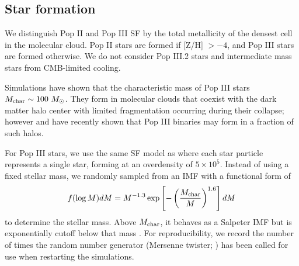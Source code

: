 \documentclass[apjl]{emulateapj}
\begin{document}

\subsection{Star formation}

We distinguish Pop II and Pop III SF by the total metallicity of the
densest cell in the molecular cloud.  Pop II stars are formed if [Z/H]
$> -4$, and Pop III stars are formed otherwise.  We do not consider
Pop III.2 stars and intermediate mass stars from CMB-limited cooling.

Simulations have shown that the characteristic mass of Pop III stars
$M_{\rm char} \sim 100~\Ms$.  They form in molecular clouds that
coexist with the dark matter halo center with limited fragmentation
occurring during their collapse; however \citet{2009Sci...325..601T}
and \citet{Stacy10_Binary} have recently shown that Pop III binaries
may form in a fraction of such halos.


For Pop III stars, we use the same SF model as \citet{Wise08_Gal} where
each star particle represents a single star, forming at an overdensity
of $5 \times 10^5$.  Instead of using a fixed stellar mass, we randomly
sampled from an IMF with a functional form of
%
\begin{equation}
\label{eqn:imf}
f(\log M) dM = M^{-1.3} \exp\left[-\left(\frac{M_{\rm
      char}}{M}\right)^{1.6}\right] dM
\end{equation}
to determine the stellar mass.  Above $M_{\rm char}$, it behaves as a
Salpeter IMF but is exponentially cutoff below that mass
\citep{Chabrier03, Clark09}.  For reproducibility, we record the number
of times the random number generator (Mersenne twister;
\citet{MTwister}) has been called for use when restarting the
simulations.

%
\end{document}
